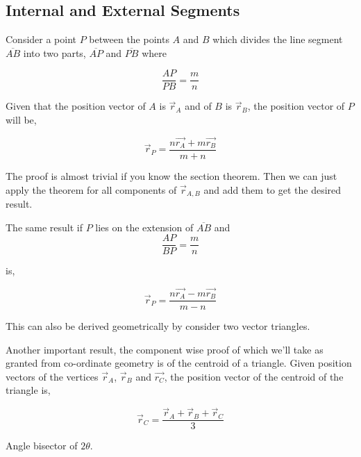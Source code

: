 \subsection{Internal and External Segments}

Consider a point \(P\) between the points \(A\) and \(B\) which divides the line segment \(\overline{AB}\) into 
two parts, \(\overline{AP}\) and \(\overline{PB}\) where

\begin{equation*}
    \frac{AP}{PB} = \frac{m}{n}
\end{equation*}

\begin{theorem}
    Given that the position vector of \(A\) is \(\vec{r}_A\) and of \(B\) is 
    \(\vec{r}_B\), the position vector of \(P\) will be,

    \begin{equation}
        \vec{r}_P = \frac{n\vec{r_A} + m\vec{r_B}}{m+n}
    \end{equation}
\end{theorem}

The proof is almost trivial if you know the section theorem. Then we can 
just apply the theorem for all components of \(\vec{r}_{A,B}\) and add them to 
get the desired result. 

The same result if \(P\) lies on the extension of \(\overline{AB}\) and 
\begin{equation*}
    \frac{AP}{BP} = \frac{m}{n}
\end{equation*}

is,

\begin{equation}
    \boxed{\vec{r}_P = \frac{n\vec{r_A} - m\vec{r_B}}{m-n}}
\end{equation}

This can also be derived geometrically by consider two vector triangles. 

Another important result, the component wise proof of which we'll take as granted from 
co-ordinate geometry is of the centroid of a triangle. Given position vectors 
of the vertices \(\vec{r}_A\), \(\vec{r}_B\) and \(\vec{r_C}\), the position 
vector of the centroid of the triangle is,

\begin{equation}
    \boxed{\vec{r}_C = \frac{\vec{r}_A + \vec{r}_B + \vec{r}_C}{3}}
\end{equation}

\begin{marginfigure}
    \centering
    \caption{Angle bisector of \(2\theta\).}
\end{marginfigure}

